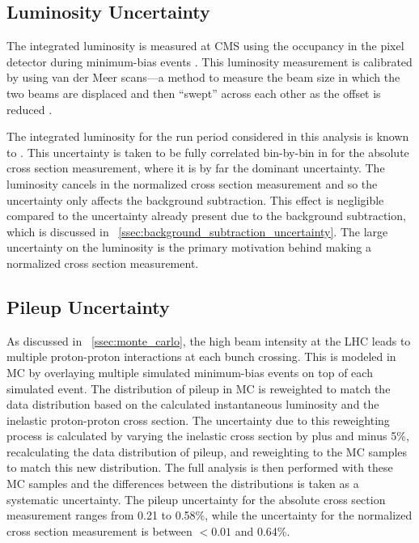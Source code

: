 \subsection{Luminosity Uncertainty}
\label{ssec:lumi_uncertainty}

The integrated luminosity is measured at CMS using the occupancy in the
pixel detector during minimum-bias events \cite{cms_lumi_2013}. This luminosity
measurement is calibrated by using van der Meer scans---a method to measure the
beam size in which the two beams are displaced and then ``swept'' across each
other as the offset is reduced \cite{vandermeer_1968}.

The integrated luminosity for the run period considered in this analysis is
known to \LumiUncertainty. This uncertainty is taken to be fully correlated
bin-by-bin in \phistar for the absolute cross section measurement, where it is
by far the dominant uncertainty. The luminosity cancels in the normalized
cross section measurement and so the uncertainty only affects the background
subtraction. This effect is negligible compared to the uncertainty already
present due to the background subtraction, which is discussed in
\SEC~\ref{ssec:background_subtraction_uncertainty}. The large uncertainty on
the luminosity is the primary motivation behind making a normalized cross
section measurement.

\subsection{Pileup Uncertainty}
\label{ssec:pileup_uncertainty}

As discussed in \SEC~\ref{ssec:monte_carlo}, the high beam intensity at the LHC
leads to multiple proton-proton interactions at each bunch crossing. This is
modeled in MC by overlaying multiple simulated minimum-bias events on top of
each simulated event. The distribution of pileup in MC is reweighted to match
the data distribution based on the calculated instantaneous luminosity and the
inelastic proton-proton cross section. The uncertainty due to this reweighting
process is calculated by varying the inelastic cross section by plus and minus
5\%, recalculating the data distribution of pileup, and reweighting to the MC
samples to match this new distribution. The full analysis is then performed
with these MC samples and the differences between the \phistar distributions is
taken as a systematic uncertainty. The pileup uncertainty for the absolute
cross section measurement ranges from 0.21 to 0.58\%, while the uncertainty for
the normalized cross section measurement is between $< 0.01$ and 0.64\%.

